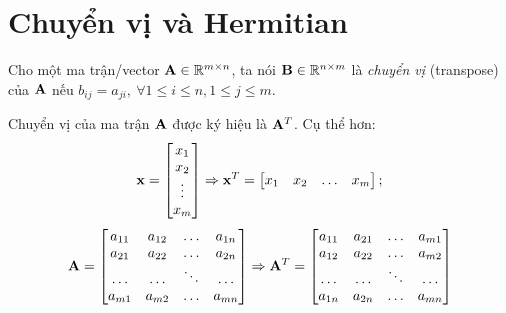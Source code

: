 \section{Chuyển vị và Hermitian} %
\label{sec:chuyen_vi}


Cho một ma trận/vector $\mathbf{A} \in \mathbb{R}^{m\times n}$, ta nói $\mathbf{B} \in \mathbb{R}^{n\times m}$ là \textit{chuyển vị} (transpose) của
$\mathbf{A}$ nếu $b_{ij} = a_{ji},~\forall 1 \leq i \leq n, 1 \leq j\leq m$.

Chuyển vị của ma trận $\mathbf{A}$ được ký hiệu là $\mathbf{A}^T$. Cụ thể hơn:
\begin{eqnarray*}
\mathbf{x} = \left[
\begin{matrix}
x_1 \\ x_2 \\ \vdots \\ x_m
\end{matrix}
\right] \Rightarrow \mathbf{x}^T = \left[
\begin{matrix}
x_1 & x_2 & \dots & x_m
\end{matrix}
\right];
\end{eqnarray*}
\begin{eqnarray*}
\mathbf{A} = \left[
\begin{matrix}
a_{11} & a_{12} & \dots & a_{1n} \\
a_{21} & a_{22} & \dots & a_{2n} \\
\dots & \dots & \ddots & \dots \\
a_{m1} & a_{m2} & \dots & a_{mn}
\end{matrix}
\right]
\Rightarrow
\mathbf{A}^T = \left[
\begin{matrix}
a_{11} & a_{21}  &\dots & a_{m1} \\
a_{12} & a_{22}  & \dots & a_{m2} \\
\dots & \dots &  \ddots & \dots \\
a_{1n} & a_{2n} & \dots & a_{mn}
\end{matrix}
\right]
\end{eqnarray*}

